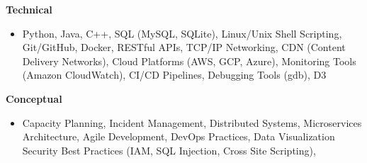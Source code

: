 \textbf{Technical}
\begin{itemize}[leftmargin=1.5em, nosep, noitemsep] %
    \item[] 
    Python,
    Java,
    C++,
    SQL (MySQL, SQLite),
    Linux/Unix Shell Scripting,
    Git/GitHub,
    Docker,
    RESTful APIs,
    TCP/IP Networking,
    CDN (Content Delivery Networks),
    Cloud Platforms (AWS, GCP, Azure),
    Monitoring Tools (Amazon CloudWatch),
    CI/CD Pipelines,
    Debugging Tools (gdb),
    D3
\end{itemize}
\textbf{Conceptual}
\begin{itemize}[leftmargin=1.5em, nosep, noitemsep] %
    \item[]
    Capacity Planning,
    Incident Management,
    Distributed Systems,
    Microservices Architecture,
    Agile Development,
    DevOps Practices,
    Data Visualization
    Security Best Practices (IAM, SQL Injection, Cross Site Scripting),
\end{itemize}
